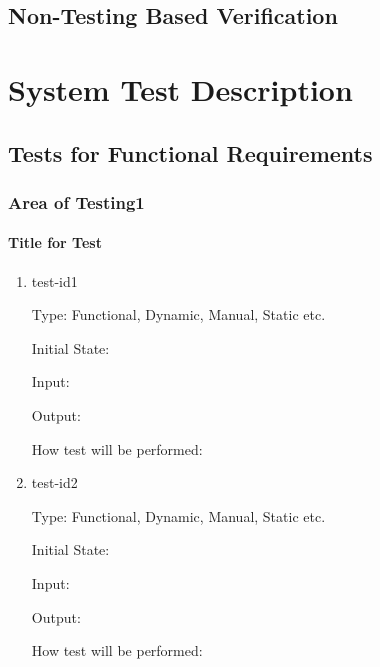 \documentclass[12pt, titlepage]{article}
\begin{document}
		

\subsection{Non-Testing Based Verification}


\section{System Test Description}
	
\subsection{Tests for Functional Requirements}

\subsubsection{Area of Testing1}
		
\paragraph{Title for Test}

\begin{enumerate}

\item{test-id1\\}

Type: Functional, Dynamic, Manual, Static etc.
					
Initial State: 
					
Input: 
					
Output: 
					
How test will be performed: 
					
\item{test-id2\\}

Type: Functional, Dynamic, Manual, Static etc.
					
Initial State: 
					
Input: 
					
Output: 
					
How test will be performed: 

\end{enumerate}
\end{document}
